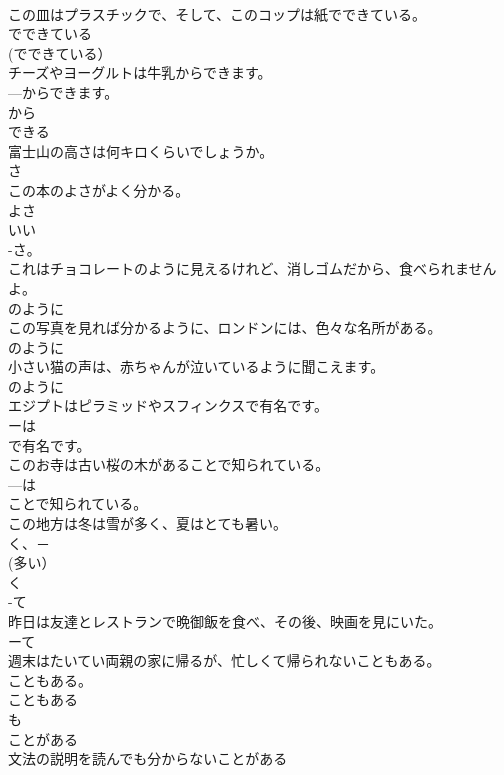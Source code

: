 \documentclass[8pt]{extreport}
\begin{document}
\begin{CJK}{UTF8}{min}
\\	この皿はプラスチックで、そして、このコップは紙でできている。	
\\	でできている 
\\	(でできている）
\\	チーズやヨーグルトは牛乳からできます。	
\\	---からできます。 
\\	から 
\\	できる 
\\	富士山の高さは何キロくらいでしょうか。	
\\	さ 
\\	この本のよさがよく分かる。	
\\	よさ　
\\	いい　
\\	-さ。
\\	これはチョコレートのように見えるけれど、消しゴムだから、食べられませんよ。	
\\	のように 
\\	この写真を見れば分かるように、ロンドンには、色々な名所がある。	
\\	のように 
\\	小さい猫の声は、赤ちゃんが泣いているように聞こえます。	
\\	のように 
\\	エジプトはピラミッドやスフィンクスで有名です。	
\\	ーは
\\	で有名です。 
\\	このお寺は古い桜の木があることで知られている。	
\\	---は
\\	ことで知られている。 
\\	この地方は冬は雪が多く、夏はとても暑い。	
\\	く、－ 
\\	(多い）
\\	く 
\\	-て 
\\	昨日は友達とレストランで晩御飯を食べ、その後、映画を見にいた。	
\\	ーて 
\\	週末はたいてい両親の家に帰るが、忙しくて帰られないこともある。	
\\	こともある。 
\\	こともある 
\\	も 
\\	ことがある 
\\	文法の説明を読んでも分からないことがある	

\end{CJK}
\end{document}
